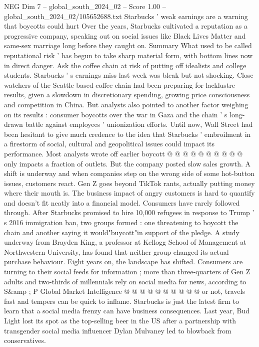 \begin{textsample}{NEG Dim 7 – global\_south\_2024\_02 – Score 1.00 – global\_south\_2024\_02/105652688.txt}  \label{ex:f7_neg_259}
Starbucks ' weak earnings are a warning that boycotts could hurt Over the years, Starbucks cultivated a reputation as a progressive company, speaking out on social issues like Black Lives Matter and same-sex marriage long before they caught on.
Summary What used to be called reputational risk ' has begun to take sharp material form, with bottom lines now in direct danger.
Ask the coffee chain at risk of putting off idealists and college students.
Starbucks ' s earnings miss last week was bleak but not shocking.
Close watchers of the Seattle-based coffee chain had been preparing for lacklustre results, given a slowdown in discretionary spending, growing price consciousness and competition in China.
But analysts also pointed to another factor weighing on its results : consumer boycotts over the war in Gaza and the chain ' s long-drawn battle against employees ' unionization efforts.
Until now, Wall Street had been hesitant to give much credence to the idea that Starbucks ' embroilment in a firestorm of social, cultural and geopolitical issues could impact its performance.
Most analysts wrote off earlier boycott @ @ @ @ @ @ @ @ @ @ only impacts a fraction of outlets.
But the company posted slow sales growth.
A shift is underway and when companies step on the wrong side of some hot-button issues, customers react.
Gen Z goes beyond TikTok rants, actually putting money where their mouth is.
The business impact of angry customers is hard to quantify and doesn't fit neatly into a financial model.
Consumers have rarely followed through.
After Starbucks promised to hire 10,000 refugees in response to Trump ' s 2016 immigration ban, two groups formed : one threatening to boycott the chain and another saying it would"buycott"in support of the pledge.
A study underway from Brayden King, a professor at Kellogg School of Management at Northwestern University, has found that neither group changed its actual purchase behaviour.
Eight years on, the landscape has shifted.
Consumers are turning to their social feeds for information ; more than three-quarters of Gen Z adults and two-thirds of millennials rely on social media for news, according to S\&amp ; P Global Market Intelligence @ @ @ @ @ @ @ @ @ @ or not, travels fast and tempers can be quick to inflame.
Starbucks is just the latest firm to learn that a social media frenzy can have business consequences.
Last year, Bud Light lost its spot as the top-selling beer in the US after a partnership with transgender social media influencer Dylan Mulvaney led to blowback from conservatives.

\end{textsample}
